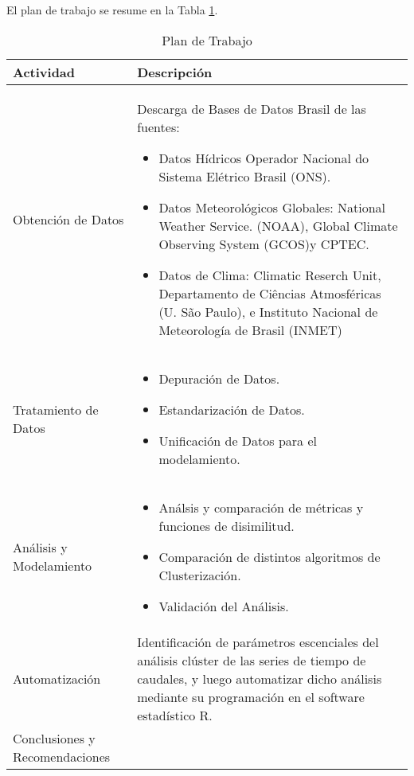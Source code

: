 \documentclass[10pt,a4paper]{article}
\begin{document}
El plan de trabajo se resume en la Tabla \ref{TablaPlan}.

\begin{table}[h!]
\centering

\label{TablaPlan}
\begin{tabular}{|m{4cm}|p{10cm}|}
\hline
Actividad  & Descripción  \\ \hline

Obtención de Datos &  

Descarga de Bases de Datos Brasil de las fuentes: 

\begin{itemize}

\item Datos Hídricos Operador Nacional do Sistema Elétrico Brasil (ONS).
\item Datos Meteorológicos Globales: National Weather Service. (NOAA), Global Climate Observing System (GCOS)y CPTEC.
\item Datos de Clima: Climatic Reserch Unit, Departamento de Ciências Atmosféricas (U. São Paulo), e Instituto Nacional de Meteorología de Brasil (INMET)
\end{itemize}

\\ \hline

Tratamiento de Datos &  

\begin{itemize}
\item Depuración de Datos.
\item Estandarización de Datos.
\item Unificación de Datos para el modelamiento.
\end{itemize}

\\ \hline


Análisis y Modelamiento &   

\begin{itemize}
\item Análsis y comparación de métricas y funciones de disimilitud.
\item Comparación de distintos algoritmos de Clusterización.
\item Validación del Análisis.
\end{itemize}

\\ \hline

Automatización & Identificación de parámetros escenciales del análisis clúster de las series de tiempo de caudales, y luego automatizar dicho análisis mediante su programación en el software estadístico R.  \\ \hline
Conclusiones y Recomendaciones &  \\ \hline
\end{tabular}
\caption{Plan de Trabajo}
\end{table}
\end{document}
